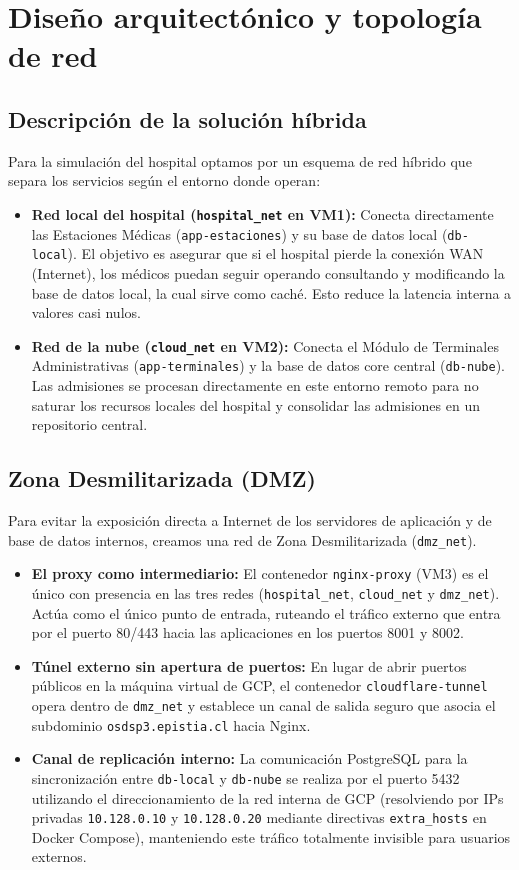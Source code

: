 \documentclass[11pt,a4paper]{article}
\begin{document}
\section{Diseño arquitectónico y topología de red}

\subsection{Descripción de la solución híbrida}
Para la simulación del hospital optamos por un esquema de red híbrido que separa los servicios según el entorno donde operan:
\begin{itemize}
    \item \textbf{Red local del hospital (\texttt{hospital\_net} en VM1):} Conecta directamente las Estaciones Médicas (\texttt{app-estaciones}) y su base de datos local (\texttt{db-local}). El objetivo es asegurar que si el hospital pierde la conexión WAN (Internet), los médicos puedan seguir operando consultando y modificando la base de datos local, la cual sirve como caché. Esto reduce la latencia interna a valores casi nulos.
    \item \textbf{Red de la nube (\texttt{cloud\_net} en VM2):} Conecta el Módulo de Terminales Administrativas (\texttt{app-terminales}) y la base de datos core central (\texttt{db-nube}). Las admisiones se procesan directamente en este entorno remoto para no saturar los recursos locales del hospital y consolidar las admisiones en un repositorio central.
\end{itemize}

\subsection{Zona Desmilitarizada (DMZ)}
Para evitar la exposición directa a Internet de los servidores de aplicación y de base de datos internos, creamos una red de Zona Desmilitarizada (\texttt{dmz\_net}).
\begin{itemize}
    \item \textbf{El proxy como intermediario:} El contenedor \texttt{nginx-proxy} (VM3) es el único con presencia en las tres redes (\texttt{hospital\_net}, \texttt{cloud\_net} y \texttt{dmz\_net}). Actúa como el único punto de entrada, ruteando el tráfico externo que entra por el puerto 80/443 hacia las aplicaciones en los puertos 8001 y 8002.
    \item \textbf{Túnel externo sin apertura de puertos:} En lugar de abrir puertos públicos en la máquina virtual de GCP, el contenedor \texttt{cloudflare-tunnel} opera dentro de \texttt{dmz\_net} y establece un canal de salida seguro que asocia el subdominio \texttt{osdsp3.epistia.cl} hacia Nginx.
    \item \textbf{Canal de replicación interno:} La comunicación PostgreSQL para la sincronización entre \texttt{db-local} y \texttt{db-nube} se realiza por el puerto 5432 utilizando el direccionamiento de la red interna de GCP (resolviendo por IPs privadas \texttt{10.128.0.10} y \texttt{10.128.0.20} mediante directivas \texttt{extra\_hosts} en Docker Compose), manteniendo este tráfico totalmente invisible para usuarios externos.
\end{itemize}
\end{document}
